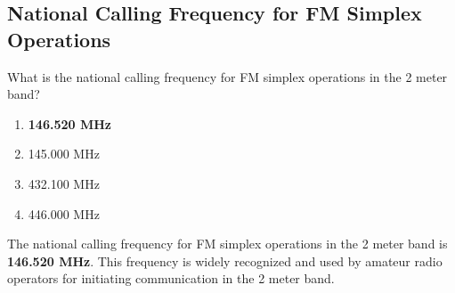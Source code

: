 \subsection{National Calling Frequency for FM Simplex Operations}\label{T2A02}

\begin{tcolorbox}[colback=gray!10!white,colframe=black!75!black,title=T2A02]
What is the national calling frequency for FM simplex operations in the 2 meter band?
\begin{enumerate}[noitemsep]
    \item \textbf{146.520 MHz}
    \item 145.000 MHz
    \item 432.100 MHz
    \item 446.000 MHz
\end{enumerate}
\end{tcolorbox}

The national calling frequency for FM simplex operations in the 2 meter band is \textbf{146.520 MHz}. This frequency is widely recognized and used by amateur radio operators for initiating communication in the 2 meter band.